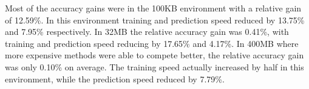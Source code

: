 Most of the accuracy gains were in the 100KB environment with a relative gain of 12.59\%. In this environment training and prediction speed reduced by 13.75\% and 7.95\% respectively. In 32MB the relative accuracy gain was 0.41\%, with training and prediction speed reducing by 17.65\% and 4.17\%. In 400MB where more expensive methods were able to compete better, the relative accuracy gain was only 0.10\% on average. The training speed actually increased by half in this environment, while the prediction speed reduced by 7.79\%.
\ENDOMIT